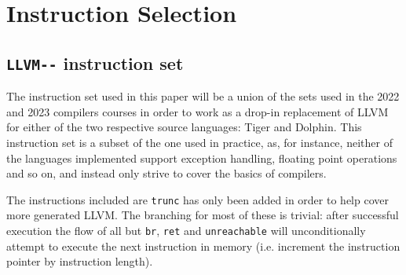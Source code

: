 \documentclass{article}
\begin{document}
\section{Instruction Selection}



\subsection{\lstinline!LLVM--! instruction set}


The instruction set used in this paper will be a union of the sets used in the 2022 and 2023 compilers courses in order to work as a drop-in replacement of LLVM for either of the two respective source languages:  Tiger and Dolphin. This instruction set is a subset of the one used in practice, as, for instance, neither of the languages implemented support exception handling, floating point operations and so on, and instead only strive to cover the basics of compilers.

The instructions included are
\lstinline!trunc! has only been added in order to help cover more generated LLVM.
The branching for most of these is trivial: after successful execution the flow of all but \lstinline!br!, \lstinline!ret! and \lstinline!unreachable! will unconditionally attempt to execute the next instruction in memory (i.e. increment the instruction pointer by instruction length).
\end{document}
